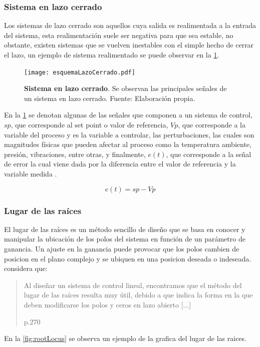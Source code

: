         \subsubsection{Sistema en lazo cerrado}
		
			Los sistemas de lazo cerrado son aquellos cuya salida es realimentada a la entrada del sistema, esta realimentación suele ser negativa para que sea estable, no obstante, existen sistemas que se vuelven inestables con el simple hecho de cerrar el lazo, un ejemplo de sistema realimentado se puede observar en la \cref{fig:esquemaLazoCerrado}.
			
			\begin{figure}[htb]
				\centering
				\texttt{[image: esquemaLazoCerrado.pdf]}
				\caption[Ejemplo de un sistema en lazo cerrado]{\textbf{Sistema en lazo cerrado}. Se observan las principales señales de un sistema en lazo cerrado. Fuente: Elaboración propia.} 
				\label{fig:esquemaLazoCerrado}
			\end{figure}
			
            En la \cref{fig:esquemaLazoCerrado} se denotan algunas de las señales que componen a un sistema de control, $sp$, que corresponde al set point o valor de referencia, $Vp$, que corresponde a la variable del proceso y es la variable a controlar, las perturbaciones, las cuales son magnitudes físicas que pueden afectar al proceso como la temperatura ambiente, presión, vibraciones, entre otras, y finalmente, $e(t)$, que corresponde a la señal de error la cual viene dada por la diferencia entre el valor de referencia y la variable medida \Parencite{maloney2006electronica}.
            
            \begin{equation}\label{eq:Serror}
				e(t) = sp - Vp
            \end{equation}
        
        \subsubsection{Lugar de las raíces}
            
            El lugar de las raíces es un método sencillo de diseño que se basa en conocer y manipular la ubicación de los polos del sistema en función de un parámetro de ganancia. Un ajuste en la ganancia puede provocar que los polos cambien de posicion en el plano complejo y se ubiquen en una posicion deseada o indeseada. \textcite{ogata2003ingenieria} considera que: \blockquote[p.270]{Al diseñar un sistema de control lineal, encontramos que el método del lugar de las raíces resulta muy útil, debido a que indica la forma en la que deben modificarse los polos y ceros en lazo abierto [...]}. En la \cref{fig:rootLocus} se observa un ejemplo de la grafica del lugar de las raices.

